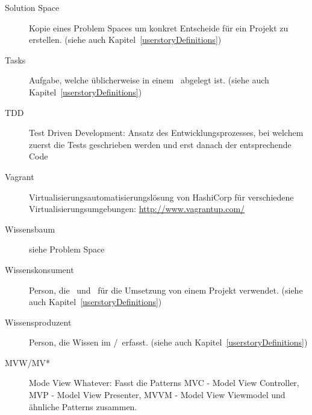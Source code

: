 \begin{description}
		\item[Solution Space]{Kopie eines Problem Spaces um konkret Entscheide für ein Projekt zu erstellen. (siehe auch Kapitel~\ref{userstoryDefinitions})}
		\item[Tasks]{Aufgabe, welche üblicherweise in einem \ppt\ abgelegt ist. (siehe auch Kapitel~\ref{userstoryDefinitions})}
		\item[TDD]{Test Driven Development: Ansatz des Entwicklungsprozesses, bei welchem zuerst die Tests geschrieben werden und erst danach der entsprechende Code}
		\item[Vagrant]{Virtualisierungsautomatisierungslösung von HashiCorp für verschiedene Virtualisierungsumgebungen: \url{http://www.vagrantup.com/}}
		\item[Wissensbaum]{siehe Problem Space}
		\item[Wissenskonsument]{Person, die \cdar\ und \eeppi\ für die Umsetzung von einem Projekt verwendet. (siehe auch Kapitel~\ref{userstoryDefinitions})}
		\item[Wissensproduzent]{Person, die Wissen im \cdar/\eeppi\ erfasst. (siehe auch Kapitel~\ref{userstoryDefinitions})}
		\item[MVW/MV*] Mode View Whatever: Fasst die Patterns MVC - Model View Controller, MVP - Model View Presenter, MVVM - Model View Viewmodel und ähnliche Patterns zusammen.
	\end{description}